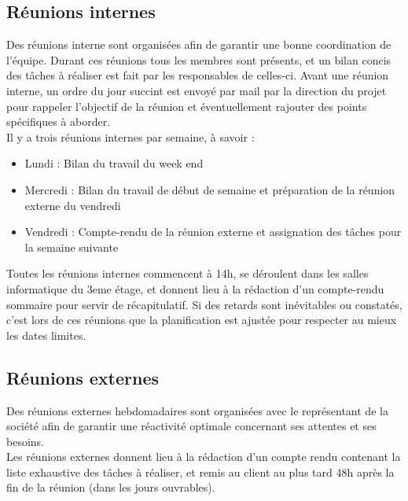 \documentclass[11pt,fleqn]{report}
\begin{document}
\subsection{Réunions internes}
Des réunions interne sont organisées afin de garantir une bonne coordination de l'équipe. Durant ces réunions tous les membres sont présents, et un bilan concis des tâches à réaliser est fait par les responsables de celles-ci. Avant une réunion interne, un ordre du jour succint est envoyé par mail par la direction du projet pour rappeler l'objectif de la réunion et éventuellement rajouter des points spécifiques à aborder.\\
Il y a trois réunions internes par semaine, à savoir :
\begin{itemize}
	\item Lundi : Bilan du travail du week end
	\item Mercredi : Bilan du travail de début de semaine et préparation de la réunion externe du vendredi
	\item Vendredi : Compte-rendu de la réunion externe et assignation des tâches pour la semaine suivante
\end{itemize}
Toutes les réunions internes commencent à 14h, se déroulent dans les salles informatique du 3eme étage, et donnent lieu à la rédaction d'un compte-rendu sommaire pour servir de récapitulatif.
Si des retards sont inévitables ou constatés, c'est lors de ces réunions que la planification est ajustée pour respecter au mieux les dates limites.

\subsection{Réunions externes}
Des réunions externes hebdomadaires sont organisées avec le représentant de la société afin de garantir une réactivité optimale concernant ses attentes et ses besoins.
\\
Les réunions externes donnent lieu à la rédaction d'un compte rendu contenant la liste exhaustive des tâches à réaliser, et remis au client au plus tard 48h après la fin de la réunion (dans les jours ouvrables).
\end{document}
